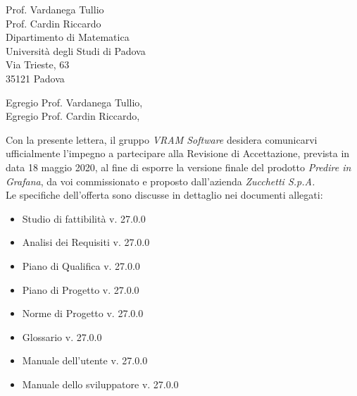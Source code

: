 \documentclass[a4paper,12pt]{letteracdp}
\date{15 maggio 2020}
\begin{document}
\begin{letter}{
		Prof. Vardanega Tullio \\
		Prof. Cardin Riccardo \\
		Dipartimento di Matematica \\
		Università degli Studi di Padova \\
		Via Trieste, 63 \\
		35121 Padova}
	
	\opening{Egregio Prof. Vardanega Tullio, \\ \noindent Egregio Prof. Cardin Riccardo,}
	
	\begin{flushleft}
	Con la presente lettera, il gruppo \textit{VRAM Software} desidera comunicarvi ufficialmente l'impegno a partecipare alla Revisione di Accettazione, prevista in data 18 maggio 2020, al fine di esporre la versione finale del prodotto \textit{Predire in Grafana}, da voi commissionato e proposto dall'azienda \textit{Zucchetti S.p.A.} \\
	Le specifiche dell'offerta sono discusse in dettaglio nei documenti allegati: \\ 
	\end{flushleft}

	\begin{itemize}
		\item Studio di fattibilità v. 27.0.0
		\item Analisi dei Requisiti v. 27.0.0
		\item Piano di Qualifica v. 27.0.0
		\item Piano di Progetto v. 27.0.0
		\item Norme di Progetto v. 27.0.0
		\item Glossario v. 27.0.0
		
		\item Manuale dell'utente v. 27.0.0
		\item Manuale dello sviluppatore v. 27.0.0
		

\end{itemize}
\end{letter}
\end{document}
